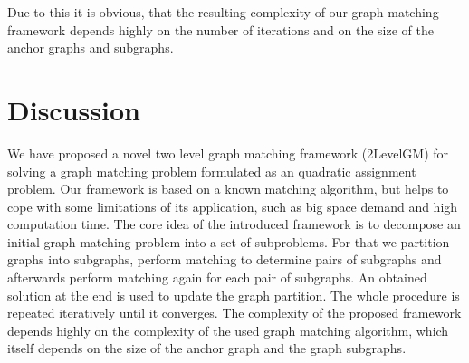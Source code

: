 Due to this it is obvious, that the resulting complexity of our graph matching framework depends highly on the number of iterations and on the size of the anchor graphs and subgraphs.


\section{Discussion}
We have proposed a novel two level graph matching framework (2LevelGM) for solving a graph matching problem formulated as an quadratic assignment problem. Our framework is based on a known matching algorithm, but helps to cope with some limitations of its application, such as big space demand and high computation time.
The core idea of the introduced framework is to decompose an initial graph matching problem into a set of subproblems. For that we partition graphs into subgraphs, perform matching to determine pairs of subgraphs and afterwards perform matching again for each pair of subgraphs. An obtained solution at the end is used to update the graph partition. The whole procedure is repeated iteratively until it converges. The complexity of the proposed framework depends highly on the complexity of the used graph matching algorithm, which itself depends on the size of the anchor graph and the graph subgraphs. %
